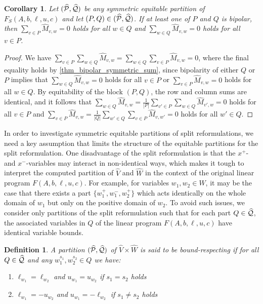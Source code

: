 \documentclass[pdflatex,sn-mathphys-num]{sn-jnl}%
\theoremstyle{thmstyleone}%
\newtheorem{definition}{Definition}
\theoremstyle{thmstylethree}%
\newtheorem{corollary}[corollary]{Corollary}
\theoremstyle{thmstyletwo}%
\begin{document}
\begin{corollary}
    \label{thm_bipolar_symmetric_equitable_sum}
    Let $(\widehat{\mathcal{P}},\widehat{\mathcal{Q}})$ be any symmetric equitable partition of $F_S(A,b,\ell,u,c)$ and let $(P,Q) \in (\widehat{\mathcal{P}},\widehat{\mathcal{Q}})$. If at least one of $P$ and $Q$ is bipolar, then $\sum_{v\in P} \widehat{M}_{v,w} = 0$ holds for all $w\in Q$ and $\sum_{w\in Q} \widehat{M}_{v,w} = 0$ holds for all $v\in P$. 
\end{corollary}
\begin{proof}
    We have $\sum_{v\in P} \sum_{w\in Q} \widehat{M}_{v,w} = \sum_{w\in Q} \sum_{v\in P} \widehat{M}_{v,w} = 0$,
    where the final equality holds by \cref{thm_bipolar_symmetric_sum}, since bipolarity of either $Q$ or $P$ implies that $\sum_{w\in Q} \widehat{M}_{v,w} = 0$ holds for all $v\in P$ or $\sum_{v\in P} \widehat{M}_{v,w} = 0$ holds for all $w\in Q$. By equitability of the block $(P,Q)$, the row and column sums are identical, and it follows that $\sum_{w\in Q} \widehat{M}_{v,w} = \frac{1}{|P|} \sum_{v'\in P} \sum_{w\in Q} \widehat{M}_{v',w} = 0$ holds for all $v\in P$ and $\sum_{v\in P} \widehat{M}_{v,w} = \frac{1}{|Q|} \sum_{w'\in Q} \sum_{v\in P} \widehat{M}_{v,w'} = 0$ holds for all $w'\in Q$.
\end{proof}
In order to investigate symmetric equitable partitions of split reformulations, we need a key assumption that limits the structure of the equitable partitions for the split reformulation. One disadvantage of the split reformulation is that the $x^+$- and $x^-$-variables may interact in non-identical ways, which makes it tough to interpret the computed partition of $\widehat{V}$ and $\widehat{W}$ in the context of the original linear program $F(A,b,\ell,u,c)$. For example, for variables $w_1,w_2\in W$, it may be the case that there exists a part $\{w_1^+,w_1^-,w_2^+\}$ which acts identically on the whole domain of $w_1$ but only on the positive domain of $w_2$. 
To avoid such issues, we consider only partitions of the split reformulation such that for each part $Q\in \widehat{\mathcal{Q}}$, the associated variables in $Q$ of the linear program $F(A,b,\ell,u,c)$ have identical variable bounds. 
\begin{definition}
    \label{def_part_domain_respecting}
    A partition $(\widehat{\mathcal{P}},\widehat{\mathcal{Q}})$ of $\widehat{V} \times \widehat{W}$ is said to be \emph{bound-respecting} if for all $Q\in \widehat{\mathcal{Q}}$ and any $w^{s_1}_1,w^{s_2}_2\in Q$ we have:
    \begin{enumerate}[label=(\roman*)]
        \item $\ell_{w_1} = \ell_{w_2}$ and $u_{w_1} = u_{w_2}$ if $s_1 = s_2$ holds
        \item $\ell_{w_1} = -u_{w_2}$ and $u_{w_1} = - \ell_{w_2}$ if $s_1 \neq s_2$ holds
    \end{enumerate}
\end{definition}
\end{document}
